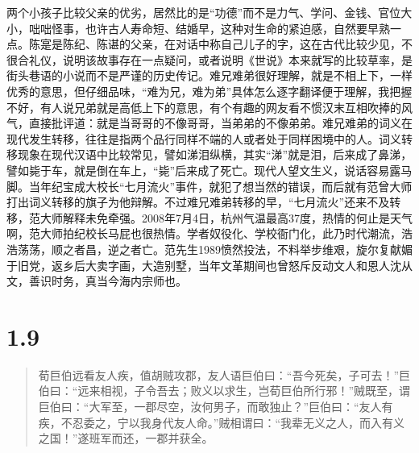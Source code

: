\documentclass[]{book}
\begin{document}
两个小孩子比较父亲的优劣，居然比的是``功德''而不是力气、学问、金钱、官位大小，咄咄怪事，也许古人寿命短、结婚早，这种对生命的紧迫感，自然要早熟一点。陈寔是陈纪、陈谌的父亲，在对话中称自己儿子的字，这在古代比较少见，不很合礼仪，说明该故事存在一点疑问，或者说明《世说》本来就写的比较草率，是街头巷语的小说而不是严谨的历史传记。难兄难弟很好理解，就是不相上下，一样优秀的意思，但仔细品味，``难为兄，难为弟''具体怎么逐字翻译便于理解，我把握不好，有人说兄弟就是高低上下的意思，有个有趣的网友看不惯汉末互相吹捧的风气，直接批评道：就是当哥哥的不像哥哥，当弟弟的不像弟弟。难兄难弟的词义在现代发生转移，往往是指两个品行同样不端的人或者处于同样困境中的人。词义转移现象在现代汉语中比较常见，譬如涕泪纵横，其实``涕''就是泪，后来成了鼻涕，譬如毙于车，就是倒在车上，``毙''后来成了死亡。现代人望文生义，说话容易露马脚。当年纪宝成大校长``七月流火''事件，就犯了想当然的错误，而后就有范曾大师打出词义转移的旗子为他辩解。不过难兄难弟转移的早，``七月流火''还来不及转移，范大师解释未免牵强。2008年7月4日，杭州气温最高37度，热情的何止是天气啊，范大师拍纪校长马屁也很热情。学者奴役化、学校衙门化，此乃时代潮流，浩浩荡荡，顺之者昌，逆之者亡。范先生1989愤然投法，不料举步维艰，旋尔复献媚于旧党，返乡后大卖字画，大造别墅，当年文革期间也曾怒斥反动文人和恩人沈从文，善识时务，真当今海内宗师也。

\section{1.9}\label{section-8}

\begin{quote}
荀巨伯远看友人疾，值胡贼攻郡，友人语巨伯曰：``吾今死矣，子可去！''巨伯曰：``远来相视，子令吾去；败义以求生，岂荀巨伯所行邪！''贼既至，谓巨伯曰：``大军至，一郡尽空，汝何男子，而敢独止？''巨伯曰：``友人有疾，不忍委之，宁以我身代友人命。''贼相谓曰：``我辈无义之人，而入有义之国！''遂班军而还，一郡并获全。
\end{quote}
\end{document}

